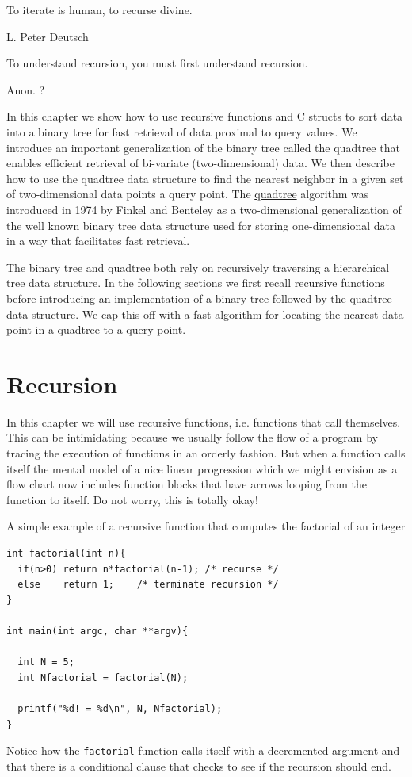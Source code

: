 \epigraph{To iterate is human, to recurse divine.}{L. Peter Deutsch}
\epigraph{To understand recursion, you must first understand recursion.}{Anon. ?}

\minitoc

In this chapter we show how to use recursive functions and C structs to sort data into a binary tree \cite{friend1956sorting,burge1958sorting,windley1960trees,walker1972hybrid} for fast retrieval of data proximal to query values. We introduce an important generalization of the binary tree called the quadtree that enables efficient retrieval of bi-variate (two-dimensional) data. We then describe how to use the quadtree data structure to find the nearest neighbor in a given set of two-dimensional data points a query point. The \href{https://en.wikipedia.org/wiki/Quadtree}{quadtree} algorithm was introduced in 1974 by Finkel and Benteley \cite{finkel1974quad,bentley1975multidimensional} as a two-dimensional generalization of the well known binary tree data structure used for storing one-dimensional data in a way that facilitates fast retrieval. 

The binary tree and quadtree both rely on recursively traversing a hierarchical tree data structure. In the following sections we first recall recursive functions before introducing an implementation of a binary tree followed by the quadtree data structure. We cap this off with a fast algorithm for locating the nearest data point in a quadtree to a query point.

\section{Recursion}
In this chapter we will use recursive functions, i.e. functions that call themselves. This can be intimidating because we usually follow the flow of a program by tracing the execution of functions in an orderly fashion. But when a function calls itself the mental model of a nice linear progression which we might envision as a flow chart now includes function blocks that have arrows looping from the function to itself. Do not worry, this is totally okay! 

A simple example of a recursive function that computes the factorial of an integer

\begin{verbatim}
int factorial(int n){
  if(n>0) return n*factorial(n-1); /* recurse */
  else    return 1;    /* terminate recursion */
}

int main(int argc, char **argv){

  int N = 5;
  int Nfactorial = factorial(N);
  
  printf("%d! = %d\n", N, Nfactorial);
}
\end{verbatim}
Notice how the \texttt{factorial} function calls itself with a decremented argument and that there is a conditional clause that checks to see if the recursion should end.

